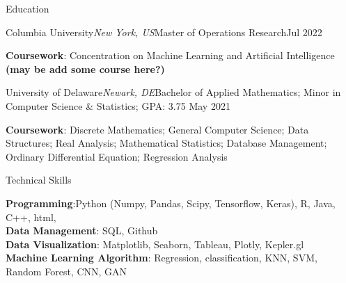 \documentclass{resume} %
\begin{document}
\begin{rSection}{Education}
	\begin{rSubsection}{Columbia University}{\em New York, US}{Master of Operations Research}{Jul 2022}
		\item {\bf Coursework}: Concentration on Machine Learning and Artificial Intelligence \bf (may be add some course here?)
	\end{rSubsection}
	\vspace{-0.1em}
	\begin{rSubsection}{University of Delaware}{\em Newark, DE}{Bachelor of Applied Mathematics; Minor in Computer Science \& Statistics; {GPA: 3.75}} 
		{May 2021} 
		\item {\bf Coursework}: Discrete Mathematics; General Computer Science; Data Structures; Real Analysis; Mathematical Statistics; Database Management; Ordinary Differential Equation; Regression Analysis

	\end{rSubsection}
\end{rSection}
	
	
\begin{rSection}{Technical Skills}
	
	{\bf Programming}:Python (Numpy, Pandas, Scipy, Tensorflow, Keras), R, Java, C++, html, \\
	{\bf Data Management}: SQL, Github \\
	{\bf Data Visualization}: Matplotlib, Seaborn, Tableau, Plotly, Kepler.gl \\
	{\bf Machine Learning Algorithm}: Regression, classification, KNN, SVM, Random Forest, CNN, GAN
\end{rSection}
	
\end{document}
